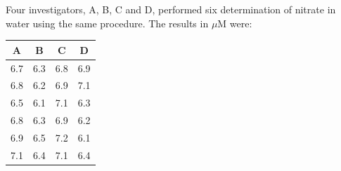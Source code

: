 %
%
%
%
%	
%	
%	


\newpage

\item Four investigators, A, B, C and D, performed six determination of nitrate in water using the same procedure. The results in $\mu$M were:


\begin{center}
	\begin{tabular}{|c|c|c|c|} \hline
		A  &  B   & C &D\\ \hline \hline
		6.7 & 6.3 & 6.8 & 6.9\\ \hline
		6.8 & 6.2 & 6.9 & 7.1\\ \hline
		6.5 & 6.1 & 7.1 &6.3 \\ \hline
		6.8 & 6.3 & 6.9 &6.2\\ \hline
		6.9 & 6.5 & 7.2 & 6.1\\ \hline
		7.1 & 6.4 & 7.1 & 6.4\\ \hline
	\end{tabular} 
\end{center}



